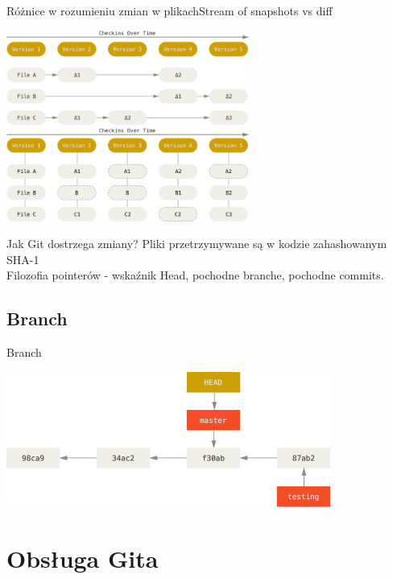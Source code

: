 \documentclass{beamer}
\begin{document}
\begin{frame}{Różnice w rozumieniu zmian w plikach}{Stream of snapshots vs diff}
  \begin{center}
   \includegraphics[width=0.6\textwidth]{./obrazki/fig-1_4.png}\\
   \includegraphics[width=0.6\textwidth]{./obrazki/fig-1_5.png}
 \end{center}

\end{frame}

\begin{frame}{Jak Git dostrzega zmiany?}
 Pliki przetrzymywane są w kodzie zahashowanym SHA-1 \\
 Filozofia pointerów - wskaźnik Head, pochodne branche, pochodne commits.
\end{frame}

\subsection{Branch}
\begin{frame}{Branch}
   \begin{center}
   \includegraphics[width=0.8\textwidth]{./obrazki/fig-3_8.png}
 \end{center}
\end{frame}

\section{Obsługa Gita}
\end{document}
